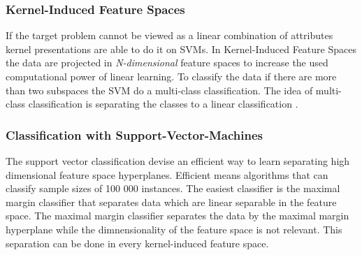 \subsubsection*{Kernel-Induced Feature Spaces}

If the target problem cannot be viewed as a linear combination of attributes kernel presentations are able to do it on SVMs. In Kernel-Induced Feature Spaces the data are projected in
\textit{N-dimensional} feature spaces to increase the used computational power of linear learning. To classify the data if there are more than two subspaces the SVM do a multi-class
classification. The idea of multi-class classification is separating the classes to a linear classification \cite{tzotsos2008support}.

\subsubsection*{Classification with Support-Vector-Machines}

The support vector classification devise an efficient way to learn separating high dimensional feature space hyperplanes. Efficient means algorithms that can classify sample sizes of 100
000 instances. The easiest classifier is the maximal margin classifier that separates data which are linear separable in the feature space. The maximal margin classifier separates the
data by the maximal margin hyperplane while the dimnensionality of the feature space is not relevant. This separation can be done in every kernel-induced feature space.
\cite{cristianini_shawe-taylor_2000}  \\

